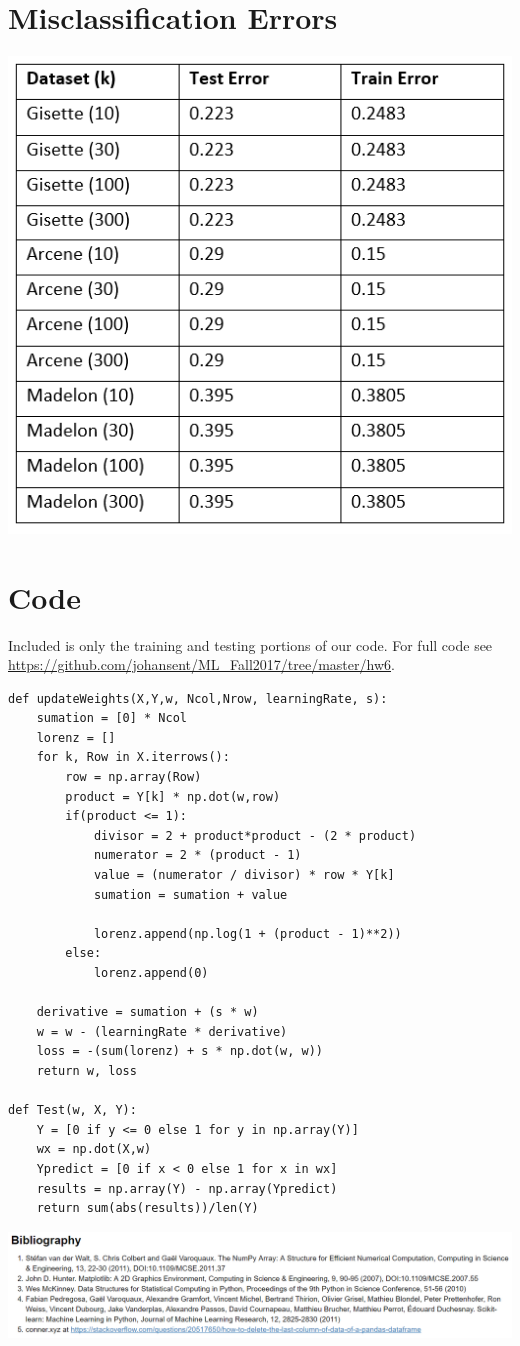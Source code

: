 \documentclass[letter]{article} %
\begin{document}
\section*{Misclassification Errors}

\includegraphics[scale=1]{table}

\section*{Code}

Included is only the training and testing portions of our code. For full code see \url{https://github.com/johansent/ML_Fall2017/tree/master/hw6}.

\begin{verbatim}
def updateWeights(X,Y,w, Ncol,Nrow, learningRate, s):
    sumation = [0] * Ncol
    lorenz = []
    for k, Row in X.iterrows():
        row = np.array(Row)
        product = Y[k] * np.dot(w,row)
        if(product <= 1):
            divisor = 2 + product*product - (2 * product)
            numerator = 2 * (product - 1)
            value = (numerator / divisor) * row * Y[k]
            sumation = sumation + value
            
            lorenz.append(np.log(1 + (product - 1)**2))
        else:
            lorenz.append(0)

    derivative = sumation + (s * w)
    w = w - (learningRate * derivative)
    loss = -(sum(lorenz) + s * np.dot(w, w))
    return w, loss

def Test(w, X, Y):
    Y = [0 if y <= 0 else 1 for y in np.array(Y)]
    wx = np.dot(X,w)
    Ypredict = [0 if x < 0 else 1 for x in wx]
    results = np.array(Y) - np.array(Ypredict)
    return sum(abs(results))/len(Y)
\end{verbatim}

\includegraphics[scale=0.6]{bib}



\end{document}
